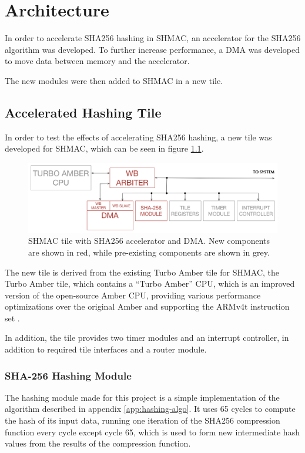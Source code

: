 \chapter{Architecture}
\label{cha:architecture}

In order to accelerate SHA256 hashing in SHMAC, an accelerator for the SHA256 algorithm
was developed. To further increase performance, a DMA was developed to move data between
memory and the accelerator.

The new modules were then added to SHMAC in a new tile.

\section{Accelerated Hashing Tile}
\label{sec:aht}

In order to test the effects of accelerating SHA256 hashing, a new tile was developed for
SHMAC, which can be seen in figure \ref{fig:SHA-Tile}.

\begin{figure}[htb]
    \centering
    \includegraphics[width=1.0\textwidth]{Figures/Tile/HashingTile}
    \caption{SHMAC tile with SHA256 accelerator and DMA. New components are shown in red, while pre-existing components are shown in grey.}
    \label{fig:SHA-Tile}
\end{figure}

The new tile is derived from the existing Turbo Amber tile for SHMAC, the Turbo Amber tile, which contains
a ``Turbo Amber'' CPU, which is an improved version of the open-source Amber CPU, providing various
performance optimizations over the original Amber and supporting the ARMv4t instruction set \cite{turboamber}.

In addition, the tile provides two timer modules and an interrupt controller, in addition to required
tile interfaces and a router module.

\subsection{SHA-256 Hashing Module}
The hashing module made for this project is a simple implementation of the algorithm described in
appendix \ref{app:hashing-algo}. It uses 65 cycles to compute the hash of its input data, running
one iteration of the SHA256 compression function every cycle except cycle 65, which is used to
form new intermediate hash values from the results of the compression function.

